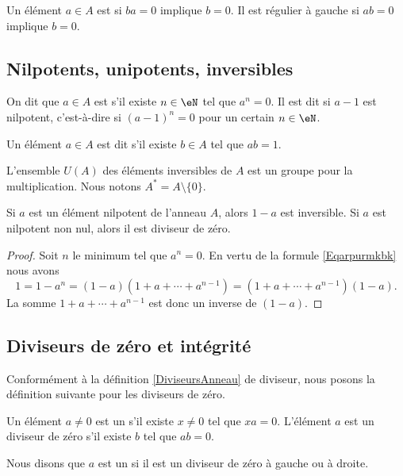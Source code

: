 \begin{definition}
Un élément \( a\in A\) est  si \( ba=0\) implique \( b=0\). Il est régulier à gauche si \( ab=0\) implique \( b=0\).
\end{definition}

\subsection{Nilpotents, unipotents, inversibles}

\begin{definition}
	On dit que \( a \in A \) est  s'il existe \( n \in \eN \) tel que \( a^n = 0 \). Il est dit  si \( a-1\) est nilpotent, c'est-à-dire si \( (a-1)^n =0\) pour un certain \( n \in \eN \).

	Un élément \( a \in A \) est dit  s'il existe \( b \in A \) tel que \( ab = 1 \).
\end{definition}

L'ensemble \( U(A)\) des éléments inversibles de \( A\) est un groupe pour la multiplication. Nous notons \( A^*=A\setminus\{ 0 \}\).


\begin{proposition}
    Si \( a\) est un élément nilpotent de l'anneau \( A\), alors \( 1-a\) est inversible. Si \( a\) est nilpotent non nul, alors il est diviseur de zéro.
\end{proposition}

\begin{proof}
    Soit \( n\) le minimum tel que \( a^n=0\). En vertu de la formule \eqref{Eqarpurmkbk} nous avons
    \begin{equation}
        1=1-a^n=(1-a)(1+a+\cdots+a^{n-1})=(1+a+\cdots+a^{n-1})(1-a).
    \end{equation}
    La somme \( 1+a+\cdots+a^{n-1}\) est donc un inverse de \( (1-a)\).
\end{proof}


\subsection{Diviseurs de zéro et intégrité}

Conformément à la définition \ref{DiviseursAnneau} de diviseur, nous posons la définition suivante pour les diviseurs de zéro.
\begin{definition}
    Un élément \( a\neq 0\) est un  s'il existe \( x\neq 0\) tel que $xa=0$. L'élément \( a\) est un diviseur de zéro  s'il existe \( b\) tel que \( ab=0\).

    Nous disons que \( a\) est un  si il est un diviseur de zéro à gauche ou à droite.
\end{definition}


